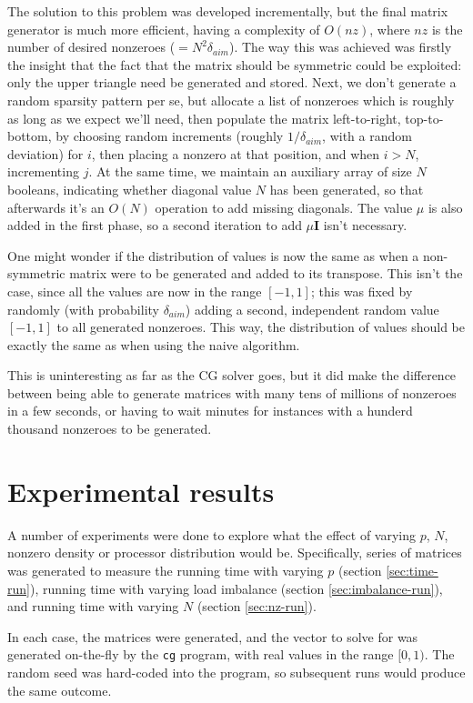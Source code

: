 \documentclass[a4paper]{article}
\newcommand{\mat}[1]{\ensuremath{\boldsymbol{#1}}}
\begin{document}
The solution to this problem was developed incrementally, but the final matrix generator is much more efficient,
having a complexity of $O(nz)$, where $nz$ is the number of desired nonzeroes ($=N^2\delta_{aim}$). The way this
was achieved was firstly the insight that the fact that the matrix should be symmetric could be exploited: only
the upper triangle need be generated and stored. Next, we don't generate a random sparsity pattern per se, but allocate
a list of nonzeroes which is roughly as long as we expect we'll need, then populate the matrix left-to-right, top-to-bottom,
by choosing random increments (roughly $1/\delta_{aim}$, with a random
deviation) for $i$, then placing a nonzero at that position, and when $i>N$,
incrementing $j$. At the same time, we maintain an auxiliary array of size $N$ booleans,
indicating whether diagonal value $N$ has been generated, so that afterwards it's an $O(N)$ operation
to add missing diagonals. The value $\mu$ is also added in the first phase, so a second iteration to add $\mu\mat I$ isn't
necessary.

One might wonder if the distribution of values is now the same as when a non-symmetric matrix were
to be generated and added to its transpose. This isn't the case, since all the values are now in the
range $[-1,1]$; this was fixed by randomly (with probability $\delta_{aim}$) adding a second, independent random
value $[-1,1]$ to all generated nonzeroes. This way, the distribution of values should be exactly the same as when
using the naive algorithm.

This is uninteresting as far as the CG solver goes, but it did make the difference between being able to generate matrices
with many tens of millions of nonzeroes in a few seconds, or having to wait minutes for instances with a hunderd thousand
nonzeroes to be generated.

\section{Experimental results}

A number of experiments were done to explore what the effect of varying $p$,
$N$, nonzero density or processor distribution would be. Specifically, series
of matrices was generated to measure the running time with varying $p$ (section
\ref{sec:time-run}), running time with varying load imbalance (section
\ref{sec:imbalance-run}), and running time with varying $N$ (section
\ref{sec:nz-run}).

In each case, the matrices were generated, and the vector to solve for
was generated on-the-fly by the \texttt{cg} program, with real values
in the range $[0,1)$. The random seed was hard-coded into the program,
    so subsequent runs would produce the same outcome.
\end{document}

